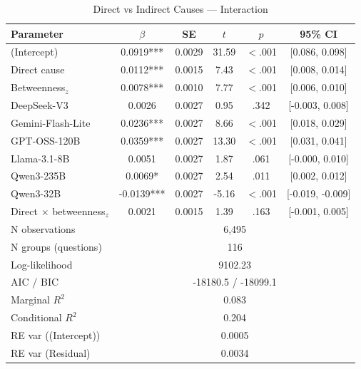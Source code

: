 \begin{table}[htbp]
\centering
\small
\caption{Direct vs Indirect Causes --- Interaction}
\label{tab:lme_direct_interaction_table}
\begin{tabular}{lccccc}
\toprule
Parameter & $\beta$ & SE & $t$ & $p$ & 95\% CI \\
\midrule
  (Intercept) & 0.0919*** & 0.0029 & 31.59 & $<$.001 & [0.086, 0.098] \\
  Direct cause & 0.0112*** & 0.0015 & 7.43 & $<$.001 & [0.008, 0.014] \\
  Betweenness$_z$ & 0.0078*** & 0.0010 & 7.77 & $<$.001 & [0.006, 0.010] \\
  DeepSeek-V3 & 0.0026 & 0.0027 & 0.95 & .342 & [-0.003, 0.008] \\
  Gemini-Flash-Lite & 0.0236*** & 0.0027 & 8.66 & $<$.001 & [0.018, 0.029] \\
  GPT-OSS-120B & 0.0359*** & 0.0027 & 13.30 & $<$.001 & [0.031, 0.041] \\
  Llama-3.1-8B & 0.0051 & 0.0027 & 1.87 & .061 & [-0.000, 0.010] \\
  Qwen3-235B & 0.0069* & 0.0027 & 2.54 & .011 & [0.002, 0.012] \\
  Qwen3-32B & -0.0139*** & 0.0027 & -5.16 & $<$.001 & [-0.019, -0.009] \\
  Direct $\times$ betweenness$_z$ & 0.0021 & 0.0015 & 1.39 & .163 & [-0.001, 0.005] \\
\midrule
  N observations & \multicolumn{5}{c}{6{,}495} \\
  N groups (questions) & \multicolumn{5}{c}{116} \\
  Log-likelihood & \multicolumn{5}{c}{9102.23} \\
  AIC / BIC & \multicolumn{5}{c}{-18180.5 / -18099.1} \\
  Marginal $R^2$ & \multicolumn{5}{c}{0.083} \\
  Conditional $R^2$ & \multicolumn{5}{c}{0.204} \\
  RE var ((Intercept)) & \multicolumn{5}{c}{0.0005} \\
  RE var (Residual) & \multicolumn{5}{c}{0.0034} \\
\bottomrule
\end{tabular}
\end{table}
